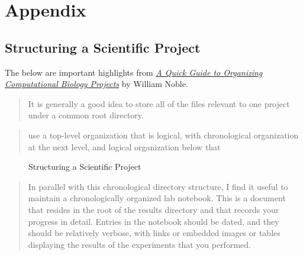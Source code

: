\documentclass[12pt,]{book}
\begin{document}
\appendix

\chapter{Appendix}\label{appendix}

\section{Structuring a Scientific
Project}\label{structuring-a-scientific-project}

The below are important highlights from
\href{http://journals.plos.org/ploscompbiol/article?id=10.1371/journal.pcbi.1000424\#pcbi-1000424-g001}{\emph{A
Quick Guide to Organizing Computational Biology Projects}} by William
Noble.

\begin{quote}
It is generally a good idea to store all of the files relevant to one
project under a common root directory.
\end{quote}

\begin{quote}
use a top-level organization that is logical, with chronological
organization at the next level, and logical organization below that
\end{quote}

\begin{figure}
\caption{Structuring a Scientific Project}
\end{figure}

\begin{quote}
In parallel with this chronological directory structure, I find it
useful to maintain a chronologically organized lab notebook. This is a
document that resides in the root of the results directory and that
records your progress in detail. Entries in the notebook should be
dated, and they should be relatively verbose, with links or embedded
images or tables displaying the results of the experiments that you
performed.
\end{quote}
\end{document}

